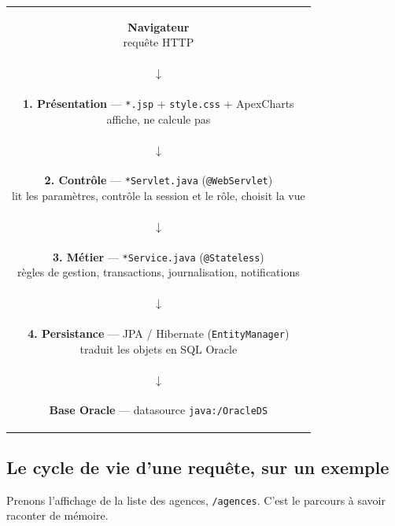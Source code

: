 \begin{center}
\small
\begin{tabular}{@{}c@{}}
\colorbox{btkpale}{\parbox{0.72\textwidth}{\centering\textbf{Navigateur}\\[2pt]\footnotesize requête HTTP}}\\[4pt]
$\downarrow$\\[4pt]
\colorbox{btkpale}{\parbox{0.72\textwidth}{\centering\textbf{1. Présentation} --- \texttt{*.jsp} + \texttt{style.css} + ApexCharts\\[2pt]\footnotesize affiche, ne calcule pas}}\\[4pt]
$\downarrow$\\[4pt]
\colorbox{btkpale}{\parbox{0.72\textwidth}{\centering\textbf{2. Contrôle} --- \texttt{*Servlet.java} (\texttt{@WebServlet})\\[2pt]\footnotesize lit les paramètres, contrôle la session et le rôle, choisit la vue}}\\[4pt]
$\downarrow$\\[4pt]
\colorbox{btkpale}{\parbox{0.72\textwidth}{\centering\textbf{3. Métier} --- \texttt{*Service.java} (\texttt{@Stateless})\\[2pt]\footnotesize règles de gestion, transactions, journalisation, notifications}}\\[4pt]
$\downarrow$\\[4pt]
\colorbox{btkpale}{\parbox{0.72\textwidth}{\centering\textbf{4. Persistance} --- JPA / Hibernate (\texttt{EntityManager})\\[2pt]\footnotesize traduit les objets en SQL Oracle}}\\[4pt]
$\downarrow$\\[4pt]
\colorbox{btkpale}{\parbox{0.72\textwidth}{\centering\textbf{Base Oracle} --- datasource \texttt{java:/OracleDS}}}
\end{tabular}
\end{center}

\subsection{Le cycle de vie d'une requête, sur un exemple}

Prenons l'affichage de la liste des agences, \texttt{/agences}. C'est le
parcours à savoir raconter de mémoire.

